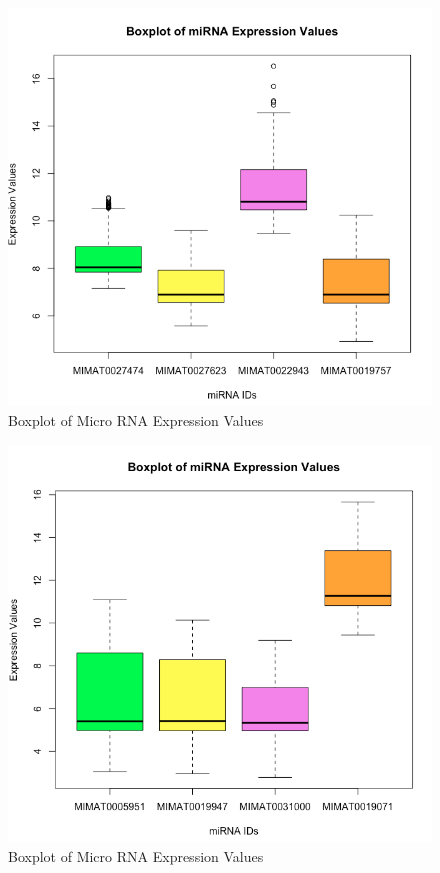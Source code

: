 \documentclass{bioinfo}
\begin{document}
\begin{methods}
\begin{enumerate}
\end{enumerate}


\begin{figure}[htbp]
\centering
\includegraphics[scale=0.40]{Boxplot1.png}
\caption{Boxplot of Micro RNA Expression Values}
\label{fig:Boxplot1}
\end{figure}

\begin{figure}[htbp]
\centering
\includegraphics[scale=0.40]{Boxplot2.png}
\caption{Boxplot of Micro RNA Expression Values}
\label{fig:Boxplot2}
\end{figure}


\end{methods}
\end{document}
